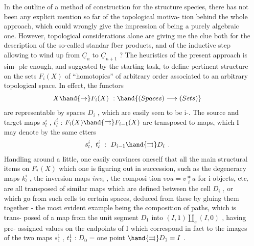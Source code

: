   In the outline of a method of construction for the structure species,
there has not been any explicit mention so far of the topological motiva-%
tion behind the whole approach,  which could wrongly give the impression
of being a purely algebraic one.  However,  topological considerations
alone are giving me the clue both for the description of the so-called
standar fber products,  and of the inductive step allowing to wind up
from $\underline{C}_{n}$ to $\underline{C}_{n+1}$ ?  The heuristics  of the present approach is sim-%
ple enough,  and suggested by the starting task,  to define pertinent
structure on the  sets $F_{i}(X)$ of ``homotopies'' of arbitrary order\hand{,} associated
to an arbitrary topological space.  In effect,  the  functors  
\[ X \hand{\mapsto} F_{i}(X) \ : \hand{(Spaces) \longrightarrow (Sets)} \]
are representable by spaces $D_{i}$ ,  which are easily seen to be i-.
The source and  target maps  $s^{i}_{l}$ , $t^{i}_{l}$ : $F_{i}(X) \hand{\rightrightarrows} F_{i-1}(X)$  are transposed
to maps, which I may denote by the same etters
\[ s^{i}_{l},\ t^{i}_{l} \ : \ D_{i-1} \hand{\rightrightarrows} D_{i} \ . \]
Handling around a little,  one easily convinces oneself that all the
main structural items on $F_{*}(X)$ which one is figuring out in succession,
such as the degeneracy maps  $k^{i}_{l}$ ,  the inversion maps $inv_{i}$ ,  the composi
tion  $vou = v \underset{i}{*} u$  for  i-objects,  etc,  are all transposed of similar
maps which are defined between the cell $D_{i}$ ,  or which go from such
cells to certain spaces,  deduced from these by gluing them together -
the most evident example  being the composition of paths,  which is trans-%
posed of a map from the unit segment $D_{1}$ into $(I,1) \amalg_{e} (I,0)$ ,  having pre-%
assigned values on the endpoints of I \hand{(} which correspond in fact to the
images of the two maps  $s^{1}_{1}$ , $t_{1}^{1}$ :  $D_{0}$ = one point $\hand{\rightrightarrows} D_{1} = I$ \hand{)}.

